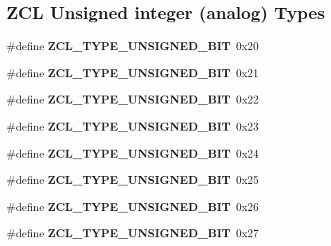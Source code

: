 \subsection*{Z\-C\-L Unsigned integer (analog) Types}
\begin{DoxyCompactItemize}
\item 
\hypertarget{group__zcl__types_ga75582ab15d44904f07a44dc8a8e3b717}{\#define {\bfseries Z\-C\-L\-\_\-\-T\-Y\-P\-E\-\_\-\-U\-N\-S\-I\-G\-N\-E\-D\-\_\-B\-I\-T}~0x20}\label{group__zcl__types_ga75582ab15d44904f07a44dc8a8e3b717}

\item 
\hypertarget{group__zcl__types_ga9045340841bc9478061ce8f87b4840da}{\#define {\bfseries Z\-C\-L\-\_\-\-T\-Y\-P\-E\-\_\-\-U\-N\-S\-I\-G\-N\-E\-D\-\_\-B\-I\-T}~0x21}\label{group__zcl__types_ga9045340841bc9478061ce8f87b4840da}

\item 
\hypertarget{group__zcl__types_gaec9a6cd5a981c98207fa270670d7d777}{\#define {\bfseries Z\-C\-L\-\_\-\-T\-Y\-P\-E\-\_\-\-U\-N\-S\-I\-G\-N\-E\-D\-\_\-B\-I\-T}~0x22}\label{group__zcl__types_gaec9a6cd5a981c98207fa270670d7d777}

\item 
\hypertarget{group__zcl__types_gab04603be22c673ef9c2fc3a2d2fcc837}{\#define {\bfseries Z\-C\-L\-\_\-\-T\-Y\-P\-E\-\_\-\-U\-N\-S\-I\-G\-N\-E\-D\-\_\-B\-I\-T}~0x23}\label{group__zcl__types_gab04603be22c673ef9c2fc3a2d2fcc837}

\item 
\hypertarget{group__zcl__types_gacd1861149c2b59749b5642737adf5195}{\#define {\bfseries Z\-C\-L\-\_\-\-T\-Y\-P\-E\-\_\-\-U\-N\-S\-I\-G\-N\-E\-D\-\_\-B\-I\-T}~0x24}\label{group__zcl__types_gacd1861149c2b59749b5642737adf5195}

\item 
\hypertarget{group__zcl__types_gaa7f4db744263603cc5405b69ade288df}{\#define {\bfseries Z\-C\-L\-\_\-\-T\-Y\-P\-E\-\_\-\-U\-N\-S\-I\-G\-N\-E\-D\-\_\-B\-I\-T}~0x25}\label{group__zcl__types_gaa7f4db744263603cc5405b69ade288df}

\item 
\hypertarget{group__zcl__types_gaad5c0f4102ddb54ecd2c0f740faecd8a}{\#define {\bfseries Z\-C\-L\-\_\-\-T\-Y\-P\-E\-\_\-\-U\-N\-S\-I\-G\-N\-E\-D\-\_\-B\-I\-T}~0x26}\label{group__zcl__types_gaad5c0f4102ddb54ecd2c0f740faecd8a}

\item 
\hypertarget{group__zcl__types_ga712121c9bf4ad400b2c08ba200538ee8}{\#define {\bfseries Z\-C\-L\-\_\-\-T\-Y\-P\-E\-\_\-\-U\-N\-S\-I\-G\-N\-E\-D\-\_\-B\-I\-T}~0x27}\label{group__zcl__types_ga712121c9bf4ad400b2c08ba200538ee8}

\end{DoxyCompactItemize}
